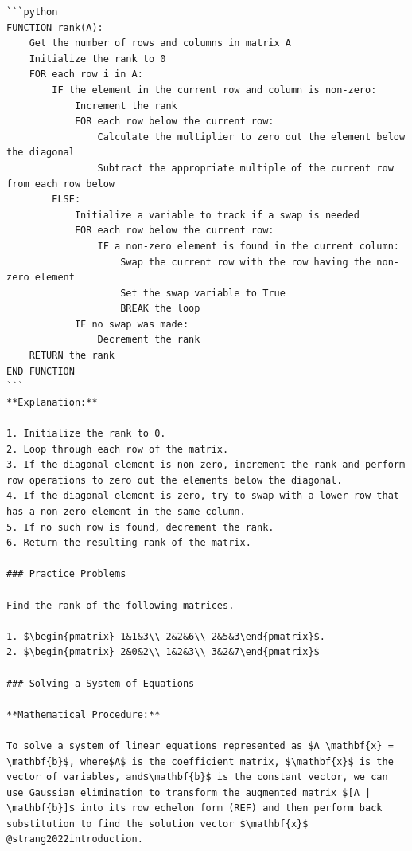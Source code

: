 \documentclass[
  letterpaper,
  DIV=11,
  numbers=noendperiod]{scrreprt}
\theoremstyle{plain}
\theoremstyle{definition}
\theoremstyle{remark}
\begin{document}
\begin{verbatim}
```python
FUNCTION rank(A):
    Get the number of rows and columns in matrix A
    Initialize the rank to 0
    FOR each row i in A:
        IF the element in the current row and column is non-zero:
            Increment the rank
            FOR each row below the current row:
                Calculate the multiplier to zero out the element below the diagonal
                Subtract the appropriate multiple of the current row from each row below
        ELSE:
            Initialize a variable to track if a swap is needed
            FOR each row below the current row:
                IF a non-zero element is found in the current column:
                    Swap the current row with the row having the non-zero element
                    Set the swap variable to True
                    BREAK the loop
            IF no swap was made:
                Decrement the rank
    RETURN the rank
END FUNCTION
```
**Explanation:**

1. Initialize the rank to 0.
2. Loop through each row of the matrix.
3. If the diagonal element is non-zero, increment the rank and perform row operations to zero out the elements below the diagonal.
4. If the diagonal element is zero, try to swap with a lower row that has a non-zero element in the same column.
5. If no such row is found, decrement the rank.
6. Return the resulting rank of the matrix.

### Practice Problems

Find the rank of the following matrices.

1. $\begin{pmatrix} 1&1&3\\ 2&2&6\\ 2&5&3\end{pmatrix}$.
2. $\begin{pmatrix} 2&0&2\\ 1&2&3\\ 3&2&7\end{pmatrix}$

### Solving a System of Equations

**Mathematical Procedure:**

To solve a system of linear equations represented as $A \mathbf{x} = \mathbf{b}$, where$A$ is the coefficient matrix, $\mathbf{x}$ is the vector of variables, and$\mathbf{b}$ is the constant vector, we can use Gaussian elimination to transform the augmented matrix $[A | \mathbf{b}]$ into its row echelon form (REF) and then perform back substitution to find the solution vector $\mathbf{x}$ @strang2022introduction.


\end{verbatim}
\end{document}
